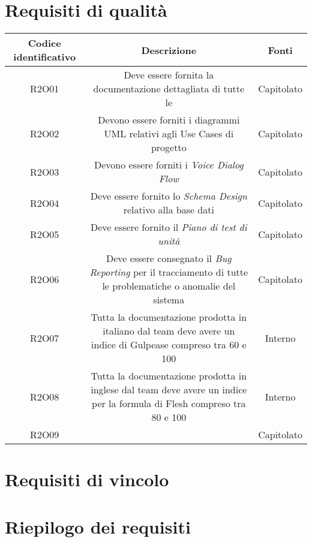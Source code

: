 \section{Requisiti di qualità}
\begin{tabularx}{\textwidth}{|C|C|C|}
	\hline
	\textbf{Codice identificativo} & \textbf{Descrizione} & \textbf{Fonti} \\
	\hline
	\endhead
	R2O01 & Deve essere fornita la documentazione dettagliata di tutte le  & Capitolato\\
	\hline
	R2O02 & Devono essere forniti i diagrammi UML relativi agli Use Cases di progetto  & Capitolato\\
	\hline
	R2O03 & Devono essere forniti i \textit{Voice Dialog Flow} & Capitolato\\
	\hline
	R2O04 & Deve essere fornito lo \textit{Schema Design} relativo alla base dati  & Capitolato\\
	\hline
	R2O05 & Deve essere fornito il \textit{Piano di test di unità} & Capitolato\\
	\hline
	R2O06 & Deve essere consegnato il \textit{Bug Reporting} per il tracciamento di
	tutte le problematiche o anomalie del sistema & Capitolato\\
	\hline
	R2O07 & Tutta la documentazione prodotta in italiano dal team deve avere
	un indice di Gulpease compreso tra 60 e 100 & Interno\\
	\hline
	R2O08 & Tutta la documentazione prodotta in inglese dal team deve avere
	un indice per la formula di Flesh compreso tra 80 e 100 & Interno\\
	\hline
	R2O09 &  & Capitolato\\
	\hline
\end{tabularx}

\section{Requisiti di vincolo}

\section{Riepilogo dei requisiti}
